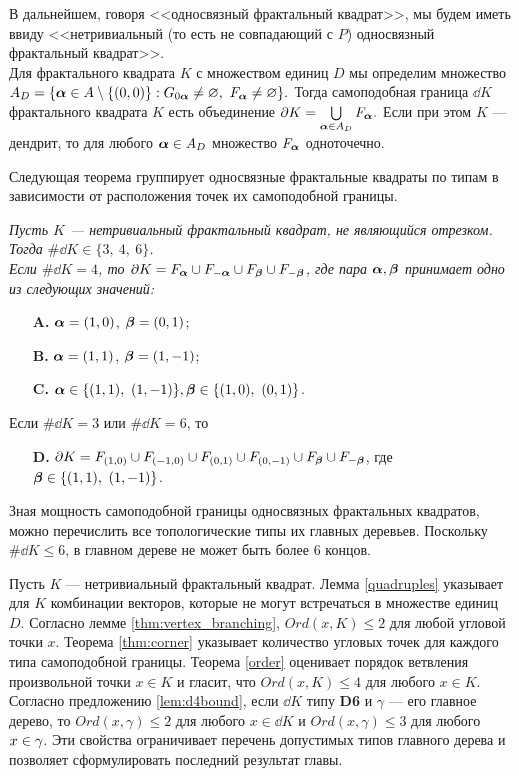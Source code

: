 В дальнейшем, говоря <<односвязный фрактальный квадрат>>, мы будем иметь ввиду <<нетривиальный (то есть не совпадающий с $P$) односвязный фрактальный квадрат>>.\\

Для фрактального квадрата $K$ с множеством единиц $D$ мы определим множество
$A_D=\{{\bm{\alpha}}\in A\setminus\{(0,0)\}: G_{0{\bm{\alpha}}}\neq\varnothing,\ F_{\bm{\alpha}}\neq\varnothing\}.$
Тогда самоподобная граница $\dd K$ фрактального квадрата $K$ есть объединение
$\partial K=\bigcup\limits_{{\bm{\alpha}}\in A_D}F_{\bm{\alpha}}.$
Если при этом $K$ --- дендрит, то для любого ${\bm{\alpha}}\in A_D$ множество $F_{\bm{\alpha}}$ одноточечно.

Следующая теорема группирует односвязные фрактальные квадраты по типам в зависимости от расположения точек их самоподобной границы.\\

{\em Пусть $K$ --- нетривиальный фрактальный квадрат, не являющийся отрезком.
Тогда $\#\dd K\in\{3,\ 4,\ 6\}$. \\
Если $\#\dd K=4$, то $\partial K=F_{\bm{\alpha}}\cup F_{-{\bm{\alpha}}}\cup F_{\bm{\beta}}\cup F_{-{\bm{\beta}}}$, где пара ${\bm{\alpha}},{\bm{\beta}}$ принимает одно из следующих значений:
\begin{itemize}[nolistsep]
\item[{\bf A.}] ${\bm{\alpha}}=(1,0)$, $ {\bm{\beta}}=(0,1)$;
\item[{\bf B.}] ${\bm{\alpha}}=(1,1)$, $ {\bm{\beta}}=(1,-1)$;
\item[{\bf C.}] $\bma\in\{(1,1),\ (1,-1)\},\bmb\in\{(1,0),\ (0,1)\}$.
\end{itemize}
Если $\#\dd K=3$ или $\#\dd K=6$, то
\begin{itemize}[nolistsep]
\item[{\bf D.}] $\partial K=F_{(1,0)}\cup F_{(-1,0)}\cup F_{(0,1)}\cup F_{(0,-1)}\cup F_{\bm{\beta}}\cup F_{-{\bm{\beta}}}$, где ${\bm{\beta}}\in\{(1,1),\ (1,-1)\}$.
\end{itemize}\quad}

 
Зная мощность самоподобной границы односвязных фрактальных квадратов, можно перечислить все топологические типы их главных деревьев.
Поскольку $\#\dd K\leq6$, в главном дереве не может быть более 6 концов.

Пусть $K$ --- нетривиальный фрактальный квадрат.
Лемма \ref{quadruples} указывает для $K$ комбинации векторов, которые не могут встречаться в множестве единиц $D$.
Согласно лемме \ref{thm:vertex_branching}, $Ord(x,K)\leq 2$ для любой угловой точки $x$.
Теорема \ref{thm:corner} указывает количество угловых точек для каждого типа самоподобной границы.
Теорема \ref{order} оценивает порядок ветвления произвольной точки $x\in K$ и гласит, что $Ord(x,K)\leq 4$ для любого $x\in K$.
Согласно предложению \ref{lem:d4bound}, если $\dd K$ типу {\bf D6} и $\gamma$ --- его главное дерево, то $Ord(x,\gamma)\leq2$ для любого $x\in\dd K$ и $Ord(x,\gamma)\leq3$ для любого $x\in\gamma$.
Эти свойства ограничивает перечень допустимых типов главного дерева и позволяет сформулировать последний результат главы.\\

